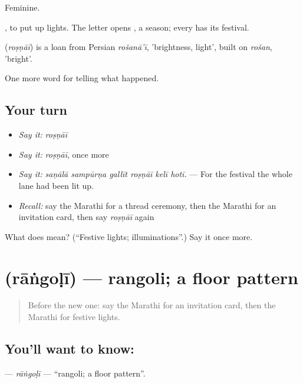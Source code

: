 Feminine.

 , to put up lights. The letter  opens , a season; every  has its festival.

\begin{cousinweb}
\textbf{} (\emph{roṣṇāī}) is a loan from Persian \emph{rošanā'ī}, 'brightness, light', built on \emph{rošan}, 'bright'.
\end{cousinweb}

\begin{grammarlens}[title={What you've built}]
One more word for telling what happened.
\end{grammarlens}

\subsection*{Your turn}
\begin{itemize}
\raggedright
  \item \emph{Say it:} \emph{roṣṇāī}
  \item \emph{Say it:} \emph{roṣṇāī}, once more
  \item \emph{Say it:} \emph{saṇālā sampūrṇa gallīt roṣṇāī kelī hotī.} — For the festival the whole lane had been lit up.
  \item \emph{Recall:} say the Marathi for a thread ceremony, then the Marathi for an invitation card, then say \emph{roṣṇāī} again
\end{itemize}

\begin{tcolorbox}[breakable,colback=teal!4,colframe=teal!35!black,title={Before you move on}]
What does  mean? (\textquotedblleft{}Festive lights; illuminations\textquotedblright{}.) Say it once more.
\end{tcolorbox}
\section[\texorpdfstring{\mr{रांगोळी} (rāṅgoḷī)}{रांगोळी (rāṅgoḷī)}]{ (rāṅgoḷī) — rangoli; a floor pattern}

\label{lesson:MR-C319-rangoli}



\begin{quote}
Before the new one: say the Marathi for an invitation card, then the Marathi for festive lights.
\end{quote}

\subsection*{You'll want to know: }
\textbf{} — \emph{rāṅgoḷī} — \textquotedblleft{}rangoli; a floor pattern\textquotedblright{}.

